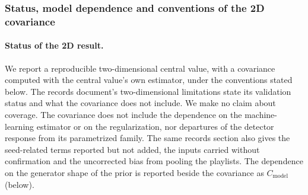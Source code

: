 \subsubsection{Status, model dependence and conventions of the 2D covariance}
\label{sec:uq-2d-scope}

\paragraph{Status of the 2D result.} We report a reproducible two-dimensional central value, with a covariance computed with the central value's own estimator, under the conventions stated below. The records document's two-dimensional limitations state its validation status and what the covariance does not include. We make no claim about coverage. The covariance does not include the dependence on the machine-learning estimator or on the regularization, nor departures of the detector response from its parametrized family. The same records section also gives the seed-related terms reported but not added, the inputs carried without confirmation and the uncorrected bias from pooling the playlists. The dependence on the generator shape of the prior is reported beside the covariance as $C_{\mathrm{model}}$ (below).

